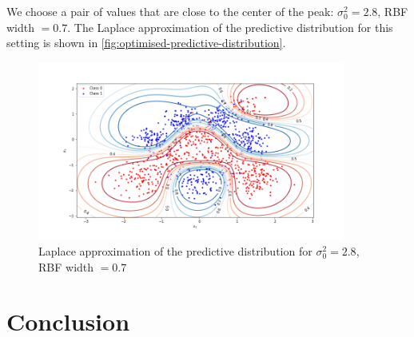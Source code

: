 \documentclass[a4paper]{article}
\begin{document}
    We choose a pair of values that are close to the center of the peak: $\sigma_0^2 = 2.8$, RBF width $= 0.7$.
    The Laplace approximation of the predictive distribution for this setting is shown in \autoref{fig:optimised-predictive-distribution}.
     \begin{figure}[h]
        \centering
        \includegraphics[width=0.9\textwidth]{plots/bayesian_logistic_classification/predictive_distribution_laplace_width_0.7_prior_variance_2.8}
        \caption{Laplace approximation of the predictive distribution for $\sigma_0^2 = 2.8$, RBF width $= 0.7$}
        \label{fig:optimised-predictive-distribution}
    \end{figure}

    \section{Conclusion}
\end{document}
